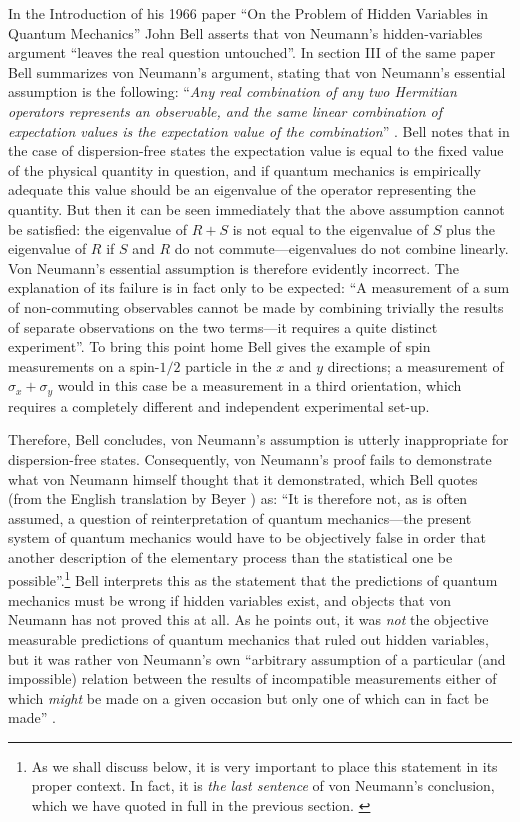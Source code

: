 \documentclass[11pt]{article}
\begin{document}
In the Introduction of his 1966 paper ``On the Problem of Hidden Variables in Quantum Mechanics'' \cite{bell66} John Bell asserts that von Neumann's hidden-variables argument ``leaves the real question untouched''. In section III of the same paper Bell summarizes von Neumann's argument, stating that von Neumann's essential assumption is the following: ``\emph{Any real combination of any two Hermitian operators represents an observable, and the same linear combination of expectation values is the expectation value of the combination}'' \cite[pp.\@ 448--449]{bell66}. Bell notes that in the case of dispersion-free states the expectation value is equal to the fixed value of the physical quantity in question, and if quantum mechanics is empirically adequate this value should be an eigenvalue of the operator representing the quantity. But then it can be seen immediately that the above assumption cannot be satisfied: the eigenvalue of $R + S$ is not equal to the eigenvalue of $S$ plus the eigenvalue of $R$ if $S$ and $R$ do not commute---eigenvalues do not combine linearly. Von Neumann's essential assumption is therefore evidently incorrect. The explanation of its failure is in fact only to be expected: ``A measurement of a sum of non-commuting observables cannot be made by combining trivially the results of separate observations on the two terms---it requires a quite distinct experiment''. To bring this point home Bell gives the example of spin measurements on a spin-$1/2$ particle in the $x$ and $y$ directions; a measurement of $\sigma_x + \sigma_y $ would in this case be a measurement in a third orientation, which requires a completely different and independent experimental set-up.

Therefore, Bell concludes, von Neumann's assumption is utterly inappropriate for dispersion-free states. Consequently, von Neumann's proof fails to demonstrate what von Neumann himself thought that it demonstrated, which Bell quotes (from the English translation by Beyer \cite{VN1}) as: ``It is therefore not, as is often assumed, a question of reinterpretation of quantum mechanics---the present system of quantum mechanics would have to be objectively false in order that another description of the elementary process than the statistical one be possible''.\footnote{As we shall discuss below, it is very important to place this statement in its proper context. In fact, it is \emph{the last sentence} of von Neumann's conclusion, which we have quoted in full in the previous section. \label{Note}} Bell interprets this as the statement that the predictions of quantum mechanics must be wrong if hidden variables exist, and objects that von Neumann has not proved this at all. As he points out, it was \emph{not} the objective measurable predictions of quantum mechanics that ruled out hidden variables, but it was rather von Neumann's own ``arbitrary assumption of a particular (and impossible) relation between the results of incompatible measurements either of which \emph{might} be made on a given occasion but only one of which can in fact be made'' \cite[p.\@ 449]{bell66}.
\end{document}
